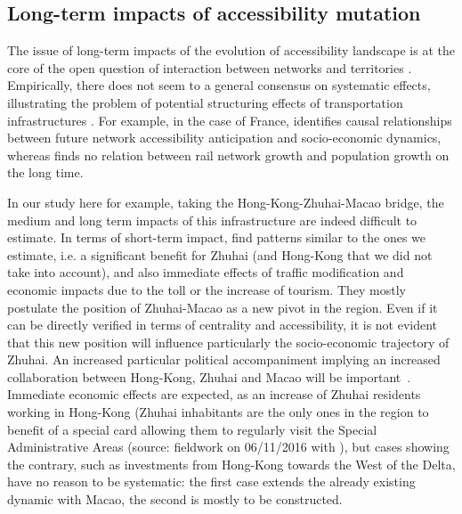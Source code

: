 \subsection{Long-term impacts of accessibility mutation}


The issue of long-term impacts of the evolution of accessibility landscape is at the core of the open question of interaction between networks and territories \citep{raimbault2018caracterisation}. Empirically, there does not seem to a general consensus on systematic effects, illustrating the problem of potential structuring effects of transportation infrastructures \citep{bonnafous1974methodologies}. For example, in the case of France, \cite{raimbault2017identification} identifies causal relationships between future network accessibility anticipation and socio-economic dynamics, whereas \cite{raimbault2018modeling} finds no relation between rail network growth and population growth on the long time.

In our study here for example, taking the Hong-Kong-Zhuhai-Macao bridge, the medium and long term impacts of this infrastructure are indeed difficult to estimate. In terms of short-term impact, \cite{wu2012impact} find patterns similar to the ones we estimate, i.e. a significant benefit for Zhuhai (and Hong-Kong that we did not take into account), and also immediate effects of traffic modification and economic impacts due to the toll or the increase of tourism. They mostly postulate the position of Zhuhai-Macao as a new pivot in the region. Even if it can be directly verified in terms of centrality and accessibility, it is not evident that this new position will influence particularly the socio-economic trajectory of Zhuhai. An increased particular political accompaniment implying an increased collaboration between Hong-Kong, Zhuhai and Macao will be important~\citep{zhou2016medium}. Immediate economic effects are expected, as an increase of Zhuhai residents working in Hong-Kong (Zhuhai inhabitants are the only ones in the region to benefit of a special card allowing them to regularly visit the Special Administrative Areas (source: fieldwork on 06/11/2016 with ), but cases showing the contrary, such as investments from Hong-Kong towards the West of the Delta, have no reason to be systematic: the first case extends the already existing dynamic with Macao, the second is mostly to be constructed.




